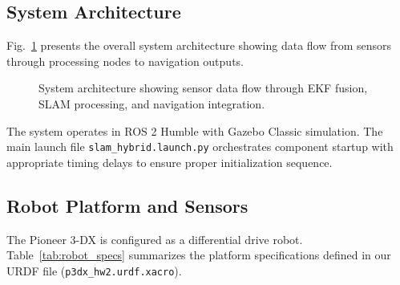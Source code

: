 \documentclass[conference]{IEEEtran}
\begin{document}
\subsection{System Architecture}

Fig.~\ref{fig:architecture} presents the overall system architecture showing data flow from sensors through processing nodes to navigation outputs.

\begin{figure}[htbp]
\centerline{
}
\caption{System architecture showing sensor data flow through EKF fusion, SLAM processing, and navigation integration.}
\label{fig:architecture}
\end{figure}

The system operates in ROS 2 Humble with Gazebo Classic simulation. The main launch file \texttt{slam\_hybrid.launch.py} orchestrates component startup with appropriate timing delays to ensure proper initialization sequence.

\subsection{Robot Platform and Sensors}

The Pioneer 3-DX is configured as a differential drive robot. Table~\ref{tab:robot_specs} summarizes the platform specifications defined in our URDF file (\texttt{p3dx\_hw2.urdf.xacro}).
\end{document}
